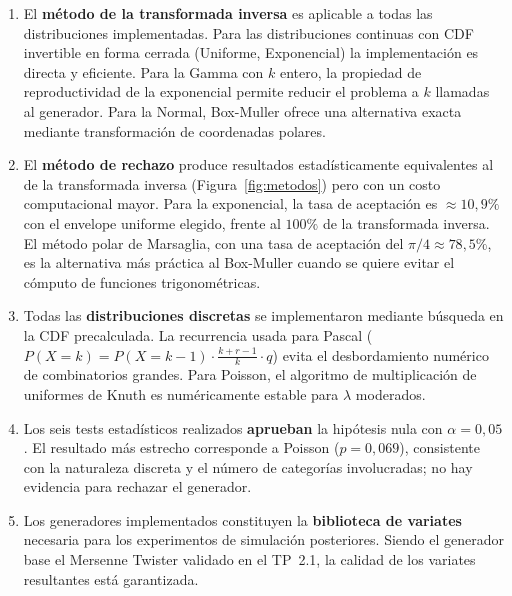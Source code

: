 \documentclass[a4paper, 11pt]{article}
\begin{document}
\begin{enumerate}
  \item El \textbf{método de la transformada inversa} es aplicable a todas las
        distribuciones implementadas. Para las distribuciones continuas con CDF
        invertible en forma cerrada (Uniforme, Exponencial) la implementación es
        directa y eficiente. Para la Gamma con $k$ entero, la propiedad de
        reproductividad de la exponencial permite reducir el problema a $k$
        llamadas al generador. Para la Normal, Box-Muller ofrece una alternativa
        exacta mediante transformación de coordenadas polares.

  \item El \textbf{método de rechazo} produce resultados estadísticamente
        equivalentes al de la transformada inversa (Figura~\ref{fig:metodos})
        pero con un costo computacional mayor. Para la exponencial, la tasa de
        aceptación es $\approx 10{,}9\%$ con el envelope uniforme elegido,
        frente al $100\%$ de la transformada inversa. El método polar de
        Marsaglia, con una tasa de aceptación del $\pi/4 \approx 78{,}5\%$, es
        la alternativa más práctica al Box-Muller cuando se quiere evitar el
        cómputo de funciones trigonométricas.

  \item Todas las \textbf{distribuciones discretas} se implementaron mediante
        búsqueda en la CDF precalculada. La recurrencia usada para Pascal
        ($P(X{=}k) = P(X{=}k{-}1)\cdot\frac{k+r-1}{k}\cdot q$) evita el
        desbordamiento numérico de combinatorios grandes. Para Poisson, el
        algoritmo de multiplicación de uniformes de Knuth es numéricamente
        estable para $\lambda$ moderados.

  \item Los seis tests estadísticos realizados \textbf{aprueban} la hipótesis
        nula con $\alpha = 0{,}05$. El resultado más estrecho corresponde a
        Poisson ($p = 0{,}069$), consistente con la naturaleza discreta y el
        número de categorías involucradas; no hay evidencia para rechazar el
        generador.

  \item Los generadores implementados constituyen la \textbf{biblioteca de
        variates} necesaria para los experimentos de simulación posteriores.
        Siendo el generador base el Mersenne Twister validado en el TP~2.1,
        la calidad de los variates resultantes está garantizada.
\end{enumerate}




\end{document}
